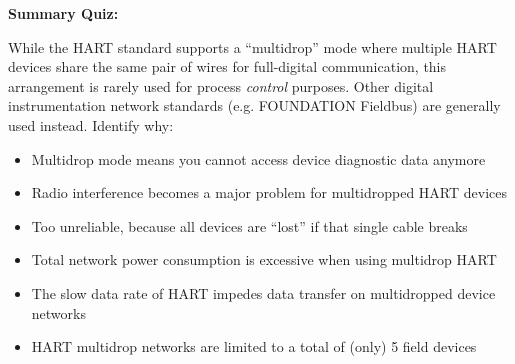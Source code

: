 \vfil \eject

\noindent
{\bf Summary Quiz:}

While the HART standard supports a ``multidrop'' mode where multiple HART devices share the same pair of wires for full-digital communication, this arrangement is rarely used for process {\it control} purposes.  Other digital instrumentation network standards (e.g. FOUNDATION Fieldbus) are generally used instead.  Identify why:

\begin{itemize}
\item{} Multidrop mode means you cannot access device diagnostic data anymore
\vskip 5pt 
\item{} Radio interference becomes a major problem for multidropped HART devices
\vskip 5pt 
\item{} Too unreliable, because all devices are ``lost'' if that single cable breaks
\vskip 5pt 
\item{} Total network power consumption is excessive when using multidrop HART
\vskip 5pt 
\item{} The slow data rate of HART impedes data transfer on multidropped device networks
\vskip 5pt 
\item{} HART multidrop networks are limited to a total of (only) 5 field devices
\end{itemize}




